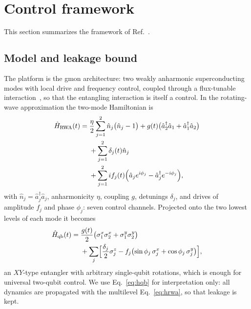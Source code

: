 \documentclass[aps,prx,twocolumn,superscriptaddress,nofootinbib,amsmath,amssymb,floatfix]{revtex4-2}
\begin{document}
\section{Control framework}
\label{sec:framework}

This section summarizes the framework of Ref.~\cite{Niu2019}.

\subsection{Model and leakage bound}
\label{sec:model}
\label{sec:tswt}

The platform is the gmon architecture: two weakly anharmonic superconducting modes with local drive and
frequency control, coupled through a flux-tunable interaction~\cite{Chen2014}, so that the entangling
interaction is itself a control. In the rotating-wave approximation the two-mode Hamiltonian
is~\cite{Niu2019}
\begin{align}
\hat{H}_{\mathrm{RWA}}(t) =\;&
\frac{\eta}{2}\sum_{j=1}^{2}\hat{n}_{j}\bigl(\hat{n}_{j}-1\bigr)
+ g(t)\bigl(\hat{a}_{2}^{\dagger}\hat{a}_{1}+\hat{a}_{1}^{\dagger}\hat{a}_{2}\bigr)
\nonumber\\
&+\sum_{j=1}^{2}\delta_{j}(t)\hat{n}_{j}
\nonumber\\
&+\sum_{j=1}^{2} i f_{j}(t)\Bigl(\hat{a}_{j}e^{i\phi_{j}} - \hat{a}_{j}^{\dagger}e^{-i\phi_{j}}\Bigr),
\label{eq:hrwa}
\end{align}
with $\hat{n}_j=\hat{a}_j^\dagger \hat{a}_j$, anharmonicity $\eta$, coupling $g$, detunings $\delta_j$, and
drives of amplitude $f_j$ and phase $\phi_j$: seven control channels. Projected onto the two lowest
levels of each mode it becomes
\begin{align}
\hat{H}_{\mathrm{qb}}(t)=\;&\frac{g(t)}{2}\bigl(\sigma_{1}^{x}\sigma_{2}^{x}+\sigma_{1}^{y}\sigma_{2}^{y}\bigr)
\nonumber\\
&+\sum_{j}\Bigl[\frac{\delta_{j}}{2}\sigma_{j}^{z}
- f_{j}\bigl(\sin\phi_{j}\,\sigma_{j}^{x}+\cos\phi_{j}\,\sigma_{j}^{y}\bigr)\Bigr],
\label{eq:hqb}
\end{align}
an $XY$-type entangler with arbitrary single-qubit rotations, which is enough for universal two-qubit
control. We use Eq.~\eqref{eq:hqb} for interpretation only: all dynamics are propagated with the
multilevel Eq.~\eqref{eq:hrwa}, so that leakage is kept.
\end{document}
